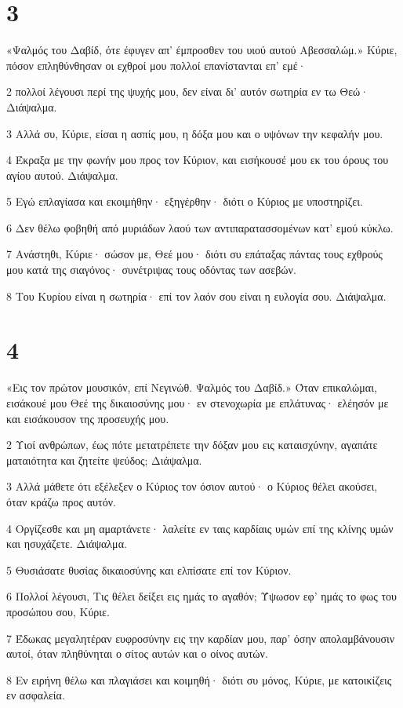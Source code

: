 \chapter{3}

\par «Ψαλμός του Δαβίδ, ότε έφυγεν απ' έμπροσθεν του υιού αυτού Αβεσσαλώμ.» Κύριε, πόσον επληθύνθησαν οι εχθροί μου πολλοί επανίστανται επ' εμέ·
\par 2 πολλοί λέγουσι περί της ψυχής μου, δεν είναι δι' αυτόν σωτηρία εν τω Θεώ· Διάψαλμα.
\par 3 Αλλά συ, Κύριε, είσαι η ασπίς μου, η δόξα μου και ο υψόνων την κεφαλήν μου.
\par 4 Έκραξα με την φωνήν μου προς τον Κύριον, και εισήκουσέ μου εκ του όρους του αγίου αυτού. Διάψαλμα.
\par 5 Εγώ επλαγίασα και εκοιμήθην· εξηγέρθην· διότι ο Κύριος με υποστηρίζει.
\par 6 Δεν θέλω φοβηθή από μυριάδων λαού των αντιπαρατασσομένων κατ' εμού κύκλω.
\par 7 Ανάστηθι, Κύριε· σώσον με, Θεέ μου· διότι συ επάταξας πάντας τους εχθρούς μου κατά της σιαγόνος· συνέτριψας τους οδόντας των ασεβών.
\par 8 Του Κυρίου είναι η σωτηρία· επί τον λαόν σου είναι η ευλογία σου. Διάψαλμα.

\chapter{4}

\par «Εις τον πρώτον μουσικόν, επί Νεγινώθ. Ψαλμός του Δαβίδ.» Όταν επικαλώμαι, εισάκουέ μου Θεέ της δικαιοσύνης μου· εν στενοχωρία με επλάτυνας· ελέησόν με και εισάκουσον της προσευχής μου.
\par 2 Υιοί ανθρώπων, έως πότε μετατρέπετε την δόξαν μου εις καταισχύνην, αγαπάτε ματαιότητα και ζητείτε ψεύδος; Διάψαλμα.
\par 3 Αλλά μάθετε ότι εξέλεξεν ο Κύριος τον όσιον αυτού· ο Κύριος θέλει ακούσει, όταν κράζω προς αυτόν.
\par 4 Οργίζεσθε και μη αμαρτάνετε· λαλείτε εν ταις καρδίαις υμών επί της κλίνης υμών και ησυχάζετε. Διάψαλμα.
\par 5 Θυσιάσατε θυσίας δικαιοσύνης και ελπίσατε επί τον Κύριον.
\par 6 Πολλοί λέγουσι, Τις θέλει δείξει εις ημάς το αγαθόν; Ύψωσον εφ' ημάς το φως του προσώπου σου, Κύριε.
\par 7 Έδωκας μεγαλητέραν ευφροσύνην εις την καρδίαν μου, παρ' όσην απολαμβάνουσιν αυτοί, όταν πληθύνηται ο σίτος αυτών και ο οίνος αυτών.
\par 8 Εν ειρήνη θέλω και πλαγιάσει και κοιμηθή· διότι συ μόνος, Κύριε, με κατοικίζεις εν ασφαλεία.

